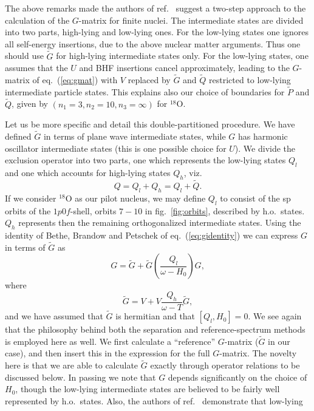 The above remarks made the authors of ref.\ \cite{kkko76} suggest a 
two-step approach to the calculation of the $G$-matrix for finite nuclei.
The intermediate states are divided into two parts, high-lying and low-lying
ones.
For the low-lying states one ignores all self-energy insertions, due to the
above nuclear matter arguments. Thus one should use $\tilde{G}$ for
high-lying intermediate states only. For the low-lying states, one assumes
that the $U$ and BHF insertions cancel approximately, leading to the
$G$-matrix of eq.\ (\ref{eq:gmat}) with $V$ replaced by $\tilde{G}$ and
$\tilde{Q}$ restricted to low-lying intermediate particle states. 
This explains also our choice of boundaries for $\tilde{P}$ and
$\tilde{Q}$, given by $(n_1=3,n_2=10,n_3=\infty)$ for $^{18}$O.

Let us be more specific and detail this double-partitioned procedure.
We have defined $\tilde{G}$ in terms of plane wave intermediate states,
while $G$ has harmonic oscillator intermediate states (this is one
possible choice for $U$). We divide the exclusion operator
into two parts, one which represents the low-lying states $Q_l$ and
one which accounts for high-lying states $Q_h$, viz.\
\[
    Q=Q_l+Q_h=Q_l+\tilde{Q}.
\]
If we consider $^{18}$O as our pilot nucleus, we may define $Q_l$ to consist
of the sp orbits of the $1p0f$-shell, orbits $7-10$ in fig.\ \ref{fig:orbits},
described by h.o.\ states. $Q_h$ represents then the remaining orthogonalized
intermediate states.
Using the identity of Bethe, Brandow and Petschek \cite{bbp63} of
eq.\ (\ref{eq:gidentity}) we can express $G$ in terms of $\tilde{G}$ as
\begin{equation}
        G=\tilde{G} +\tilde{G}
        \left(\frac{Q_l}{\omega -H_0}\right)G,
        \label{eq:gidfinite}
\end{equation}
where
\[
  \tilde{G}=V+V\frac{Q_h}{\omega -T}\tilde{G},
\]
and we have assumed that $\tilde{G}$ is hermitian and that $[Q_l,H_0]=0$.
We see again that the philosophy behind both the separation and
reference-spectrum methods is employed here as well. We first calculate
a ``reference'' $G$-matrix ($\tilde{G}$ in our case), and then insert this
in the expression for the full $G$-matrix. The novelty here is that
we are able to calculate $\tilde{G}$ exactly through operator relations
to be discussed below. In passing we note that $G$ depends significantly 
on the choice of $H_0$, though the low-lying intermediate states
are believed to be fairly well represented by h.o.\ states. 
Also, the authors of ref.\ \cite{kkko76} demonstrate that low-lying
